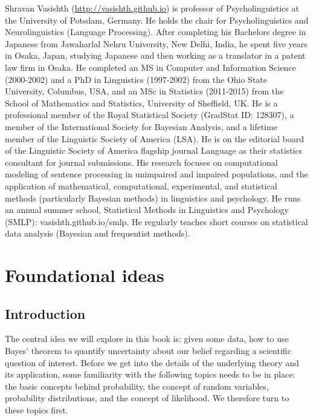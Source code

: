 \documentclass[12pt,]{krantz}
\theoremstyle{definition}
\theoremstyle{definition}
\theoremstyle{definition}
\theoremstyle{remark}
\begin{document}
Shravan Vasishth (\url{http://vasishth.github.io}) is professor of Psycholinguistics at the University of Potsdam, Germany. He holds the chair for Psycholinguistics and Neurolinguistics (Language Processing). After completing his Bachelors degree in Japanese from Jawaharlal Nehru University, New Delhi, India, he spent five years in Osaka, Japan, studying Japanese and then working as a translator in a patent law firm in Osaka. He completed an MS in Computer and Information Science (2000-2002) and a PhD in Linguistics (1997-2002) from the Ohio State University, Columbus, USA, and an MSc in Statistics (2011-2015) from the School of Mathematics and Statistics, University of Sheffield, UK. He is a professional member of the Royal Statistical Society (GradStat ID: 128307), a member of the International Society for Bayesian Analysis, and a lifetime member of the Linguistic Society of America (LSA). He is on the editorial board of the Linguistic Society of America flagship journal Language as their statistics consultant for journal submissions. His research focuses on computational modeling of sentence processing in unimpaired and impaired populations, and the application of mathematical, computational, experimental, and statistical methods (particularly Bayesian methods) in linguistics and psychology. He runs an annual summer school, Statistical Methods in Linguistics and Psychology (SMLP): vasishth.github.io/smlp. He regularly teaches short courses on statistical data analysis (Bayesian and frequentist methods).

\mainmatter

\hypertarget{part-foundational-ideas}{%
\part{Foundational ideas}\label{part-foundational-ideas}}

\hypertarget{introduction}{%
\chapter{Introduction}\label{introduction}}

The central idea we will explore in this book is: given some data, how to use Bayes' theorem to quantify uncertainty about our belief regarding a scientific question of interest. Before we get into the details of the underlying theory and its application, some familiarity with the following topics needs to be in place: the basic concepts behind probability, the concept of random variables, probability distributions, and the concept of likelihood. We therefore turn to these topics first.
\end{document}
